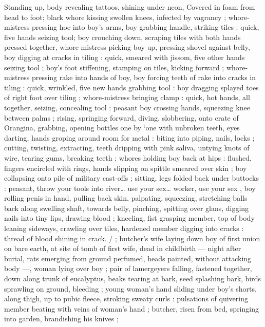 Standing up, body revealing tattoos, shining under neon, 
Covered in foam from head to foot; black whore kissing swollen 
knees, infected by vagrancy ; whore-mistress pressing hoe into boy's 
arms, boy grabbing handle, striking tiles : quick, five hands seizing 
tool; boy crouching down, scraping tiles with both hands pressed 
together, whore-mistress picking boy up, pressing shovel against 
belly, boy digging at cracks in tiling : quick, smeared with jissom, five 
other hands seizing tool ; boy's foot stiffening, stamping on tiles, 
kicking forward ; whore-mistress pressing rake into hands of boy, 
boy forcing teeth of rake into cracks in tiling : quick, wrinkled, five 
new hands grabbing tool : boy dragging splayed toes of right foot 
over tiling ; whore-mistress bringing clamp : quick, hot hands, all 
together, seizing, concealing tool : peasant boy crossing hands, 
squeezing knee between palms ; rising, springing forward, diving. 
slobbering, onto crate of Orangina, grabbing, opening bottles one by 
‘one with unbroken teeth, eyes darting, hands groping around room 
for metal : biting into piping, nails, locks ; cutting, twisting, 
extracting, teeth dripping with pink saliva, untying knots of wire, 
tearing gums, breaking teeth ; whores holding boy back at hips : 
flushed, fingers encircled with rings, hands slipping on spittle 
smeared over skin ; boy collapsing onto pile of military cast-offs ; 
sitting, legs folded back under buttocks : {\td} {\gl} peasant, throw your 
tools into river{\ldots} use your sex{\ldots} worker, use your sex{\td} {\gr}, boy rolling 
penis in hand, pulling back skin, palpating, squeezing, stretching 
balls back along swelling shaft, towards belly, pinching, spitting over 
glans, digging nails into tiny lips, drawing blood ; kneeling, fist 
grasping member, top of body leaning sideways, crawling over tiles, 
hardened member digging into cracks : thread of blood shining in 
crack. {\slash} ; butcher's wife laying down boy of first union on bare earth, 
at site of tomb of first wife, dead in childbirth --- night after burial, 
rats emerging from ground perfumed, heads painted, without 
attacking body ---, woman lying over boy ; pair of lamergeyers 
falling, fastened together, down along trunk of eucalyptus, beaks 
tearing at bark, seed splashing bark, birds sprawling on ground, 
bleeding ; young woman's hand sliding under boy's shorts, along 
thigh, up to pubic fleece, stroking sweaty curls : pulsations of 
quivering member beating with veins of woman's hand ; butcher, 
risen from bed, springing into garden, brandishing his knives ; 
